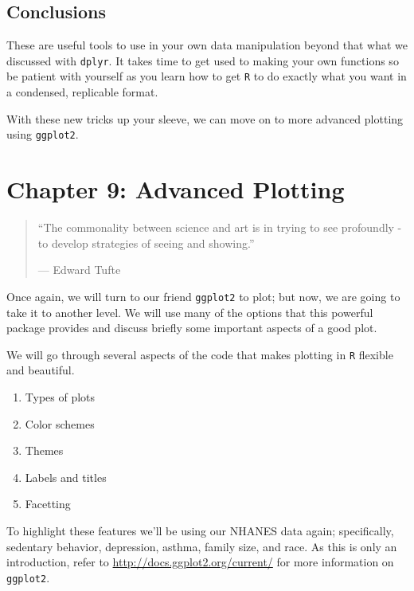 \documentclass[]{tufte-book}
\providecommand{\tightlist}{%
  \setlength{\itemsep}{0pt}\setlength{\parskip}{0pt}}
\theoremstyle{definition}
\theoremstyle{definition}
\theoremstyle{remark}
\begin{document}
\section*{Conclusions}\label{conclusions-4}

These are useful tools to use in your own data manipulation beyond that
what we discussed with \texttt{dplyr}. It takes time to get used to
making your own functions so be patient with yourself as you learn how
to get \texttt{R} to do exactly what you want in a condensed, replicable
format.

With these new tricks up your sleeve, we can move on to more advanced
plotting using \texttt{ggplot2}.

\chapter*{Chapter 9: Advanced
Plotting}\label{chapter-9-advanced-plotting}

\begin{quote}
``The commonality between science and art is in trying to see profoundly
- to develop strategies of seeing and showing.''

--- Edward Tufte
\end{quote}

Once again, we will turn to our friend \texttt{ggplot2} to plot; but
now, we are going to take it to another level. We will use many of the
options that this powerful package provides and discuss briefly some
important aspects of a good plot.

We will go through several aspects of the code that makes plotting in
\texttt{R} flexible and beautiful.

\begin{enumerate}
\def\labelenumi{\arabic{enumi}.}
\tightlist
\item
  Types of plots
\item
  Color schemes
\item
  Themes
\item
  Labels and titles
\item
  Facetting
\end{enumerate}

To highlight these features we'll be using our NHANES data again;
specifically, sedentary behavior, depression, asthma, family size, and
race. As this is only an introduction, refer to
\url{http://docs.ggplot2.org/current/} for more information on
\texttt{ggplot2}.
\end{document}
